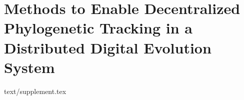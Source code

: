\chapter{Methods to Enable Decentralized Phylogenetic Tracking in a Distributed Digital Evolution System}
\label{ch:distributed-phylogeny-appendix}

{text/supplement.tex}
